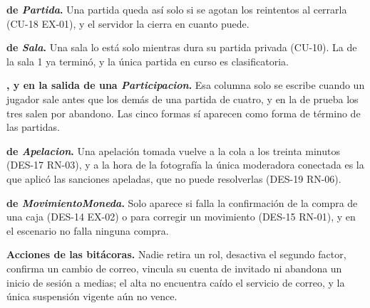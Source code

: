 \begin{reglas}
  \item \textbf{ de \textit{Partida}.} Una partida queda así solo si se agotan los reintentos al cerrarla (\mbox{CU-18} \mbox{EX-01}), y el servidor la cierra en cuanto puede.
  \item \textbf{ de \textit{Sala}.} Una sala lo está solo mientras dura su partida privada (\mbox{CU-10}). La de la sala 1 ya terminó, y la única partida en curso es clasificatoria.
  \item \textbf{,  y  en la salida de una \textit{Participacion}.} Esa columna solo se escribe cuando un jugador sale antes que los demás de una partida de cuatro, y en la de prueba los tres salen por abandono. Las cinco formas sí aparecen como forma de término de las partidas.
  \item \textbf{ de \textit{Apelacion}.} Una apelación tomada vuelve a la cola a los treinta minutos (\mbox{DES-17} \mbox{RN-03}), y a la hora de la fotografía la única moderadora conectada es la que aplicó las sanciones apeladas, que no puede resolverlas (\mbox{DES-19} \mbox{RN-06}).
  \item \textbf{ de \textit{MovimientoMoneda}.} Solo aparece si falla la confirmación de la compra de una caja (\mbox{DES-14} \mbox{EX-02}) o para corregir un movimiento (\mbox{DES-15} \mbox{RN-01}), y en el escenario no falla ninguna compra.
  \item \textbf{Acciones de las bitácoras.} Nadie retira un rol, desactiva el segundo factor, confirma un cambio de correo, vincula su cuenta de invitado ni abandona un inicio de sesión a medias; el alta no encuentra caído el servicio de correo, y la única suspensión vigente aún no vence.
\end{reglas}
